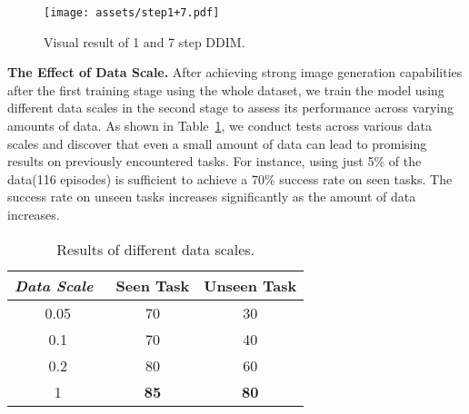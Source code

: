 \begin{figure}[ht]
\centering
\texttt{[image: assets/step1+7.pdf]}
\vspace{-2em}
\caption{Visual result of 1 and 7 step DDIM.}
\vspace{-1em}
\label{fig:step1}
\end{figure}

\noindent\textbf{The Effect of Data Scale.}
After achieving strong image generation capabilities after the first training stage using the whole dataset, we train the model using different data scales in the second stage to assess its performance across varying amounts of data.
As shown in Table~\ref{tab:data_scale}, we conduct tests across various data scales and discover that even a small amount of data can lead to promising results on previously encountered tasks. For instance, using just 5\% of the data(116 episodes) is sufficient to achieve a 70\% success rate on seen tasks. The success rate on unseen tasks increases significantly as the amount of data increases.

\begin{table}[h]
 \small
  \centering
  \begin{tabular}{ccc}
    \toprule
    {\it Data Scale}~&Seen Task &Unseen Task\\
    \midrule
    0.05 &70 &30\\
    0.1 &70 &40\\
    0.2 &80 &60\\
    1 & \bf{85} &\bf{80}\\
    \bottomrule
  \end{tabular}
  \vspace{-0.4em}
  \caption{Results of different data scales.}
  \label{tab:data_scale}
  \vspace{-5mm}
\end{table}

